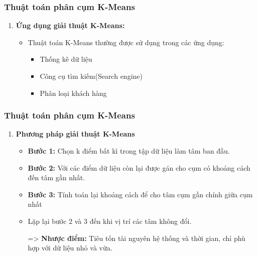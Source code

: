 \documentclass[12pt]{beamer}
\begin{document}
	\begin{frame}
		\frametitle{Thuật toán phân cụm K-Means}
		\begin{enumerate} [\textbf{2.}]
			\item \textbf{Ứng dụng giải thuật K-Means:}
			\begin{itemize}
				\item Thuật toán K-Means thường được sử dụng trong các ứng dụng:
				\begin{itemize}
					\item Thống kê dữ liệu
					\item Công cụ tìm kiếm(Search engine)
					\item Phân loại khách hàng
				\end{itemize}
			\end{itemize}
		\end{enumerate}
	\end{frame}
	
	\begin{frame}
		\frametitle{Thuật toán phân cụm K-Means}
		\begin{enumerate} [\textbf{3.}]
			\item \textbf{Phương pháp giải thuật K-Means}
				\begin{itemize}
					\item \textbf{Bước 1:} Chọn k điểm bất kì trong tập dữ liệu làm tâm ban đầu.
					\item \textbf{Bước 2:} Với các điểm dữ liệu còn lại được gán cho cụm có khoảng cách đến tâm gần nhất.
					\item \textbf{Bước 3:} Tính toán lại khoảng cách để cho tâm cụm gần chính giữa cụm nhất
					\item Lặp lại bước 2 và 3 đến khi vị trí các tâm không đổi.
					\item[=>] \textbf{Nhược điểm:} Tiêu tốn tài nguyên hệ thống và thời gian, chỉ phù hợp với dữ liệu nhỏ và vừa.
				\end{itemize}
		\end{enumerate}
	\end{frame}
\end{document}
